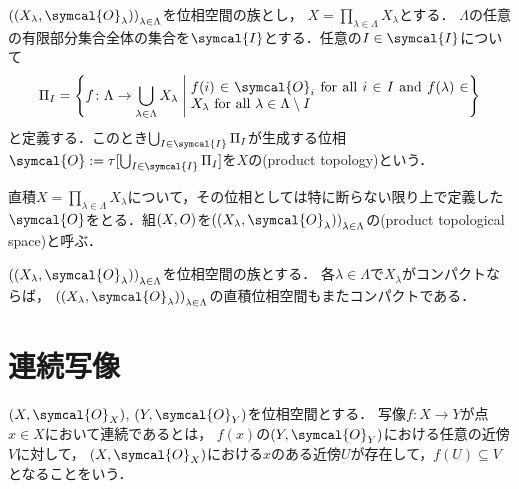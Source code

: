\documentclass{ltjsbook}
\begin{document}
\begin{thmbox}
\begin{definition}
\({\tuple{\tuple{X_\lambda, \symcal{O}_\lambda}}}_{\lambda \in \Lambda}\)を位相空間の族とし，
\(X = \prod_{\lambda \in \Lambda} X_\lambda\)とする．
\(\Lambda\)の任意の有限部分集合全体の集合を\(\symcal{I}\)とする．任意の\(I \in \symcal{I}\)について
\begin{align*}
    \Pi_I = \left\{ f\colon \Lambda \to \bigcup_{\lambda \in \Lambda} X_\lambda \relmiddle{|} \text{\parbox{7cm}{\(f(i) \in \symcal{O}_i\) for all \(i \in I\) and \(f(\lambda) \in X_\lambda\) for all \(\lambda \in \Lambda \setminus I\)}}\right\}
\end{align*}
と定義する．このとき\(\bigcup_{I \in \symcal{I}} \Pi_I\)が生成する位相\(\symcal{O}:=\tau[\bigcup_{I \in \symcal{I}}\Pi_I]\)を\(X\)の(product topology)という．
\end{definition}
\end{thmbox}

直積\(X = \prod_{\lambda \in \Lambda} X_\lambda\)について，その位相としては特に断らない限り上で定義した\(\symcal{O}\)をとる．組\((X, O)\)を\({\tuple{\tuple{X_\lambda, \symcal{O}_\lambda}}}_{\lambda \in \Lambda}\)の(product topological space)と呼ぶ．


\begin{thmbox}
\begin{theorem}[（Tikhonovの定理）]
\({\tuple{\tuple{X_\lambda, \symcal{O}_\lambda}}}_{\lambda \in \Lambda}\)を位相空間の族とする．
各\(\lambda \in \Lambda\)で\(X_\lambda\)がコンパクトならば，
\({\tuple{\tuple{X_\lambda, \symcal{O}_\lambda}}}_{\lambda \in \Lambda}\)の直積位相空間もまたコンパクトである．
\end{theorem}
\end{thmbox}

\section{連続写像}
\begin{thmbox}
\begin{definition}
\(\tuple{X, \symcal{O}_{X}}\), \(\tuple{Y, \symcal{O}_{Y}}\)を位相空間とする．
写像\(f\colon X \to Y\)が点\(x \in X\)において連続であるとは，
\(f(x)\)の\(\tuple{Y, \symcal{O}_{Y}}\)における任意の近傍\(V\)に対して，
\(\tuple{X, \symcal{O}_{X}}\)における\(x\)のある近傍\(U\)が存在して，\(f(U) \subseteq V\)となることをいう．
\end{definition}
\end{thmbox}
\end{document}
